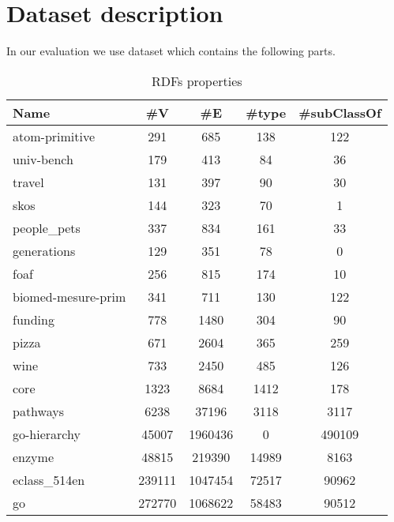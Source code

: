 \section{Dataset description}\label{section:dataset}

In our evaluation we use dataset which contains the following parts.
{\setlength{\tabcolsep}{0.4em}
	\begin{table}[h]
		\caption{RDFs properties}
		\label{tbl:propRDF}
		\begin{tabular}{| l | c | c | c | c |}
			\hline
			Name                  & \#V    & \#E     & \#type &\#subClassOf \\
			\hline
			\hline
			atom-primitive				& 291		& 685		& 138	& 122	\\
			univ-bench					& 179		& 413		& 84		& 36		\\
			travel						& 131		& 397		& 90		& 30		\\
			skos							& 144		& 323		& 70		& 1		\\
			people\_pets					& 337		& 834		& 161	& 33		\\
			generations					& 129		& 351		& 78		& 0		\\
			foaf							& 256		& 815		& 174	& 10		\\
			biomed-mesure-prim   	    & 341		& 711		& 130	& 122	\\
			funding						& 778		& 1480		& 304	& 90               \\
			pizza						& 671		& 2604		& 365	& 259              \\
			wine							& 733		& 2450		& 485	& 126              \\
			core							& 1323		& 8684		& 1412	& 178              \\
			pathways						& 6238		& 37196		& 3118 	& 3117             \\
			go-hierarchy					& 45007		& 1960436	& 0		& 490109           \\
			enzyme						& 48815		& 219390		& 14989	& 8163             \\
			eclass\_514en				& 239111		& 1047454	& 72517	& 90962            \\
			go							& 272770		& 1068622	& 58483	& 90512            \\
			\hline
		\end{tabular}
	\end{table}
}

